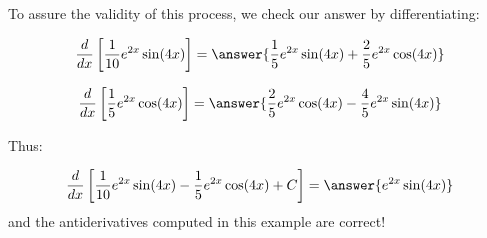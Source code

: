\documentclass{ximera}
\begin{document}
\begin{exercise}
\begin{exercise}
\begin{exercise}
\begin{exercise}
To assure the validity of this process, we check our answer by differentiating:

\[
\ddx \left[\frac{1}{10} e^{2x}\sin(4x) \right] = \answer{\frac{1}{5}e^{2x}\sin(4x)+\frac{2}{5} e^{2x} \cos(4x)}
\]

\[
\ddx \left[\frac{1}{5} e^{2x}\cos(4x) \right] = \answer{\frac{2}{5}e^{2x}\cos(4x)-\frac{4}{5} e^{2x} \sin(4x)}
\]

\begin{exercise}
Thus:

\[
\ddx \left[\frac{1}{10}e^{2x}\sin(4x)-\frac{1}{5}e^{2x}\cos(4x) +C\right] = \answer{e^{2x}\sin(4x)}
\] 
and the antiderivatives computed in this example are correct!



\end{exercise}

\end{exercise}

\end{exercise}
\end{exercise}
\end{exercise}
\end{document}
